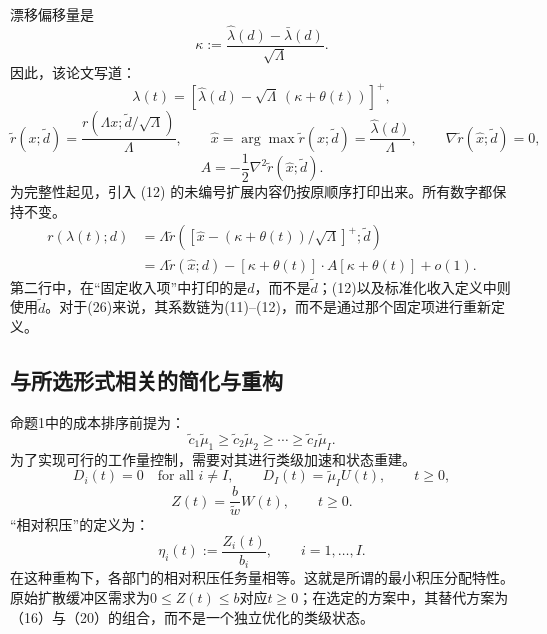 \documentclass[11pt]{article}
\begin{document}
漂移偏移量是
\begin{equation}
\kappa:=\frac{\hat\lambda(d)-\bar\lambda(d)}{\sqrt\Lambda}.
\tag{11}
\end{equation}
因此，该论文写道：
\[
\lambda(t)=[\hat\lambda(d)-\sqrt\Lambda\,(\kappa+\theta(t))]^+,
\]
\[
\tilde r(x;\tilde d)=\frac{r(\Lambda x;\tilde d/\sqrt\Lambda)}{\Lambda},
\qquad
\hat x=\arg\max\tilde r(x;\tilde d)=\frac{\hat\lambda(d)}{\Lambda},
\qquad
\nabla\tilde r(\hat x;\tilde d)=0,
\]
\begin{equation}
A=-\frac12\nabla^2\tilde r(\hat x;\tilde d).
\tag{12}
\end{equation}
为完整性起见，引入 (12) 的未编号扩展内容仍按原顺序打印出来。所有数字都保持不变。
\[
\begin{aligned}
r(\lambda(t);d)
&=\Lambda\tilde r\left([\hat x-(\kappa+\theta(t))/\sqrt\Lambda]^+;\tilde d\right)\\
&=\Lambda\tilde r(\hat x;d)
-[\kappa+\theta(t)]\cdot A[\kappa+\theta(t)]+o(1).
\end{aligned}
\]
第二行中，在“固定收入项”中打印的是\(d\)，而不是\(\tilde d\)；(12)以及标准化收入定义中则使用\(\tilde d\)。对于(26)来说，其系数链为(11)--(12)，而不是通过那个固定项进行重新定义。

\subsection*{与所选形式相关的简化与重构}

命题1中的成本排序前提为：
\[
\tilde c_1\tilde\mu_1\geq\tilde c_2\tilde\mu_2
\geq\cdots\geq\tilde c_I\tilde\mu_I.
\]
为了实现可行的工作量控制，需要对其进行类级加速和状态重建。
\begin{equation}
D_i(t)=0\quad\text{for all }i\ne I,
\qquad D_I(t)=\tilde\mu_I U(t),\qquad t\geq0,
\tag{19}
\end{equation}
\begin{equation}
Z(t)=\frac b{\tilde w}W(t),\qquad t\geq0.
\tag{20}
\end{equation}
“相对积压”的定义为：
\[
\eta_i(t):=\frac{Z_i(t)}{b_i},\qquad i=1,\ldots,I.
\]
在这种重构下，各部门的相对积压任务量相等。这就是所谓的最小积压分配特性。原始扩散缓冲区需求为\(0\leq Z(t)\leq b\)对应\(t\geq0\)；在选定的方案中，其替代方案为（16）与（20）的组合，而不是一个独立优化的类级状态。
\end{document}
